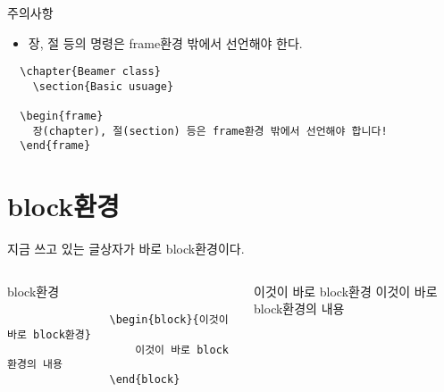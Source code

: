 \documentclass[hyperref={unicode}]{beamer}
\begin{document}
\begin{frame}[fragile]

\begin{block}{주의사항}
\begin{itemize}
	\item 장, 절 등의 명령은 frame환경 밖에서 선언해야 한다. 
\end{itemize}


\begin{block}{}
\begin{center}
\begin{verbatim}
  \chapter{Beamer class} 
    \section{Basic usuage}

  \begin{frame} 
    장(chapter), 절(section) 등은 frame환경 밖에서 선언해야 합니다!
  \end{frame}

\end{verbatim}
\end{center}

\end{block}
\end{block}
\end{frame}

\section{block환경}
\begin{frame}[fragile]
\begin{block}{}지금 쓰고 있는 글상자가 바로 block환경이다. \end{block}
\begin{columns}[c]
	\begin{column}{0.5\textwidth}
		\begin{block}{block환경}
			\begin{center}
			\begin{verbatim}
				\begin{block}{이것이 바로 block환경}
				   	이것이 바로 block환경의 내용
				\end{block}
			\end{verbatim}
			\end{center}

		\end{block}	
	\end{column}
	
	\begin{column}{0.5\textwidth}
		\begin{block}{이것이 바로 block환경}
			이것이 바로 block환경의 내용
		\end{block}	
	\end{column}

\end{columns}
\end{frame}
\end{document}
